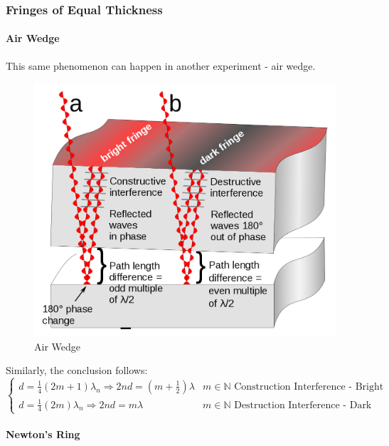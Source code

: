 \documentclass[openany]{book}
\begin{document}
\subsubsection{Fringes of Equal Thickness}
\paragraph{Air Wedge}
This same phenomenon can happen in another experiment - air wedge. 
\begin{figure}[H]
\centering
\includegraphics[scale=0.16]{Figure/Air_Wedge_1.PNG}
\caption{Air Wedge}
\end{figure}
Similarly, the conclusion follows:
\[\begin{cases}
d = \frac{1}{4}(2m+1)\lambda _n\Rightarrow 2nd=\left(m+\frac{1}{2}\right)\lambda &m\in \mathbb{N} \textrm{ Construction Interference - Bright Fringe}\\
d = \frac{1}{4}(2m)\lambda _n\Rightarrow 2nd=m\lambda &m\in \mathbb{N} \textrm{ Destruction Interference  - Dark Fringe}
\end{cases}\]

\paragraph{Newton's Ring}
\end{document}
